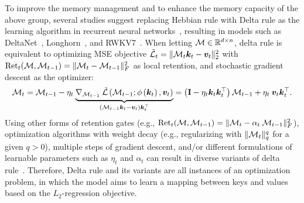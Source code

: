 { To improve the memory management and to enhance the memory capacity of the above group, several studies suggest replacing Hebbian rule with Delta rule as the learning algorithm in recurrent neural networks~\citep{schlag2021linear}, resulting in models such as DeltaNet~\citep{schlag2021linear}, Longhorn~\citep{liu2024longhorn}, and RWKV7~\citep{peng2025rwkv7}. When letting $\mathcal{M} \in \mathbb{R}^{d \times n}$, delta rule is equivalent to optimizing MSE objective $\tilde{\mathcal{L}}_t = \|\mathcal{M}_t \boldsymbol{k}_t - \boldsymbol{v}_t\|^2_2$ with $\text{Ret}_t(\mathcal{M}, \mathcal{M}_{t-1}) = \| \mathcal{M}_t - \mathcal{M}_{t-1} \|_F^2$ as local retention, and stochastic gradient descent as the optimizer:
\begin{align}
    \mathcal{M}_t = \mathcal{M}_{t-1} - \eta_t \:  \underset{\left(\mathcal{M}_{t-1}\boldsymbol{k}_t - \boldsymbol{v}_t\right) \boldsymbol{k}_t^{\top}}{\underbrace{\nabla_{\mathcal{M}_{t-1}} \: \tilde{\mathcal{L}}\left( \mathcal{M}_{t-1}; \phi\left(\boldsymbol{k}_t\right), \boldsymbol{v}_t \right)}} = \left( \mathbf{I} - \eta_t \boldsymbol{k}_t \boldsymbol{k}_t^{\top}\right) \mathcal{M}_{t-1} + \eta_t \:\boldsymbol{v}_t \boldsymbol{k}_t^{\top}.
\end{align}
Using other forms of retention gates (e.g., $\text{Ret}_t(\mathcal{M}, \mathcal{M}_{t-1}) = \| \mathcal{M}_t - \alpha_t \:\mathcal{M}_{t-1} \|_F^2$), optimization algorithms with weight decay (e.g., regularizing with $\|\mathcal{M}_{t}\|_q^q$ for a given $q > 0$), multiple steps of gradient descent, and/or different formulations of learnable parameters such as $\eta_t$ and $\alpha_t$ can result in diverse variants of delta rule~\citep{peng2025rwkv7, sun2024learning, hu2025improving, wang2025test, siems2025deltaproduct, irie2021going, liu2024longhorn, behrouz2025Miras}. Therefore, Delta rule and its variants are all instances of an optimization problem, in which the model aims to learn a mapping between keys and values based on the $L_2$-regression objective. 


}
